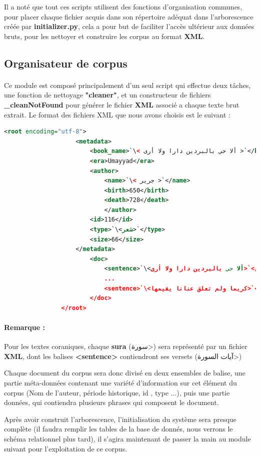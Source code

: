 \documentclass[]{report}
\begin{document}
			\par 
			Il a noté que tout ces scripts utilisent des fonctions d'organisation communes, pour placer chaque fichier acquis dans son répertoire adéquat dans l'arborescence créée par \textbf{initializer.py}, cela a pour but de faciliter l'accès ultérieur aux données bruts, pour les nettoyer et construire les corpus au format \textbf{XML}.
		\subsection{Organisateur de corpus}
			\paragraph{}
			Ce module est composé principalement d'un seul script qui effectue deux tâches, une fonction de nettoyage \textbf{"cleaner"}, et un constructeur de fichiers \textbf{\_cleanNotFound} pour générer le fichier \textbf{XML} associé a chaque texte brut extrait.
			Le format des fichiers XML que nous avons choisis est le suivant : 
			
			
			\begin{lstlisting}[language=XML]
			 	<root encoding="utf-8">
				 	<metadata>
					 	<book_name>`\< ألا حي بالبردين دارا ولا أرى >`</book_name>
					 	<era>Umayyad</era>
					 	<author>
						 	<name>`\< جرير >`</name>
						 	<birth>650</birth>
						 	<death>728</death>
						 	</author>
					 	<id>116</id>
					 	<type>`\<شعر>`</type>
					 	<size>66</size>
				 	</metadata>
					 	<doc>
						 	<sentence>`\<ألا حي بالبردين دارا ولا أرى>`</sentence>
						 	...
						 	<sentence>`\<كريما ولم تعلق عنانا يقيمها>`</sentence>
					 	</doc>
			 	</root>
			\end{lstlisting}
			
			\paragraph{Remarque : }
			Pour les textes coraniques, chaque \textbf{sura} (\<سورة>) sera représenté par un fichier \textbf{XML}, dont les balises 	\textbf{<sentence>} contiendront ses versets (\<آيات السورة>)
			
			\par
			Chaque document du corpus sera donc divisé en deux ensembles de balise, une partie méta-données contenant une variété d'information sur cet élément du corpus
			(Nom de l'auteur, période historique, id , type ...), puis une partie données, qui contiendra plusieurs phrases qui composent le document.
			\par 
			Après avoir construit l'arborescence, l'initialisation du système sera presque complète (il faudra remplir les tables de la base de donnés, nous verrons le schéma relationnel plus tard), il s'agira maintenant de passer la main au module suivant pour l'exploitation de ce corpus.
			
\end{document}
